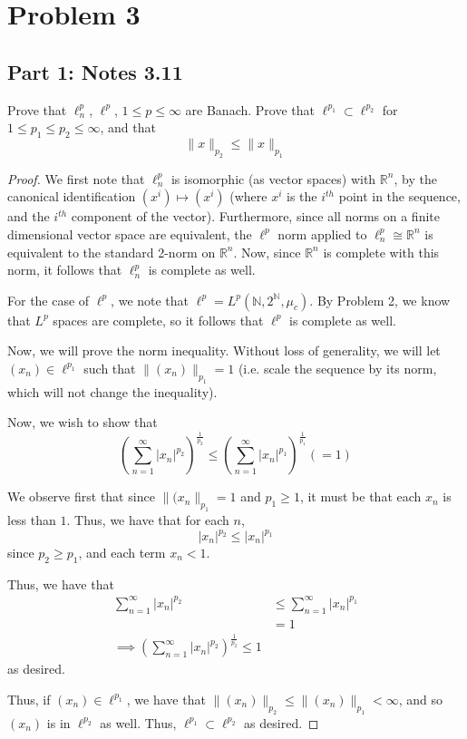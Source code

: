 \documentclass[fontsize=11pt]{scrartcl} %
\numberwithin{equation}{section} %
\numberwithin{figure}{section} %
\numberwithin{table}{section} %
\newcommand{\R}{\mathbb{R}}
\newcommand{\N}{\mathbb{N}}
\begin{document}
\section*{Problem 3}
\subsection*{Part 1: Notes 3.11}
Prove that $\ell^p_n$, $\ell^p$, $1\leq p\leq \infty$ are Banach. Prove that
$\ell^{p_1}\subset \ell^{p_2}$ for $1\leq p_1\leq p_2\leq \infty$, and that
\[
    \|x\|_{p_2}\leq \|x\|_{p_1}
\]

\begin{proof}
    We first note that $\ell^p_n$ is isomorphic (as vector spaces) with $\R^n$,
    by the canonical identification $(x^i)\mapsto (x^i)$ (where $x^i$ is the
    $i^{th}$ point in the sequence, and the $i^{th}$ component of the vector).
    Furthermore, since all norms on a finite dimensional vector space are
    equivalent, the $\ell^p$ norm applied to $\ell^p_n\cong \R^n$ is equivalent
    to the standard 2-norm on $\R^n$. Now, since $\R^n$ is complete with this
    norm, it follows that $\ell^p_n$ is complete as well.

    For the case of $\ell^p$, we note that $\ell^p = L^p(\N,2^{\N},\mu_c)$. By
    Problem 2, we know that $L^p$ spaces are complete, so it follows that
    $\ell^p$ is complete as well.

    Now, we will prove the norm inequality. Without loss of generality, we will
    let $(x_n)\in\ell^{p_1}$ such that $\|(x_n)\|_{p_1} = 1$ (i.e. scale the
    sequence by its norm, which will not change the inequality).

    Now, we wish to show that
    \[
        \left(\sum_{n=1}^{\infty}|x_n|^{p_2}\right)^{\frac{1}{p_2}} \leq
        \left(\sum_{n=1}^{\infty}|x_n|^{p_1}\right)^{\frac{1}{p_1}} (=1)
    \]

    We observe first that since $\|(x_n\|_{p_1} = 1$ and $p_1\geq 1$, it must be
    that each $x_n$ is less than $1$. Thus, we have that for each $n$,
    \[
        |x_n|^{p_2}\leq |x_n|^{p_1}
    \]
    since $p_2 \geq p_1$, and each term $x_n < 1$.

    Thus, we have that
    \[
        \begin{aligned}
            \sum_{n=1}^{\infty}|x_n|^{p_2} &\leq
            \sum_{n=1}^{\infty}|x_n|^{p_1}\\
            &= 1\\
            \implies 
        \left(\sum_{n=1}^{\infty}|x_n|^{p_2}\right)^{\frac{1}{p_2}} \leq 1
        \end{aligned}
    \]
    as desired.

    Thus, if $(x_n)\in\ell^{p_1}$, we have that
    $\|(x_n)\|_{p_2}\leq\|(x_n)\|_{p_1} < \infty$, and so $(x_n)$ is in
    $\ell^{p_2}$ as well. Thus, $\ell^{p_1}\subset\ell^{p_2}$ as desired.
\end{proof}
\end{document}
